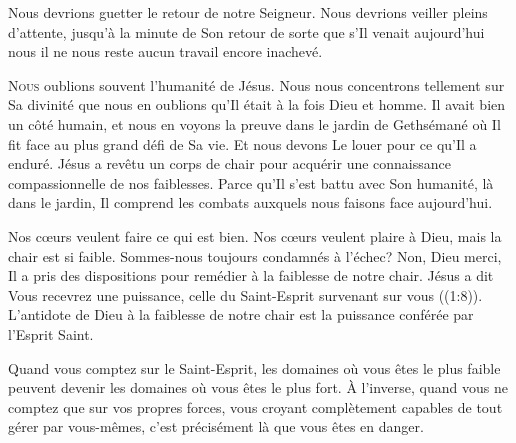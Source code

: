 
Nous devrions guetter le retour de notre Seigneur.
 Nous devrions veiller pleins d'attente, jusqu'à la minute de Son retour
 \ocadr de sorte que s'Il venait aujourd'hui
 nous il ne nous reste aucun travail encore inachevé.

\dvrule






\lettrine{N}{ous} oublions souvent l'humanité de Jésus.
 Nous nous concentrons tellement sur Sa divinité que nous en oublions
 qu'Il était à la fois Dieu et homme. Il avait bien un côté humain,
 et nous en voyons la preuve dans le jardin de Gethsémané
 \ocadr où Il fit face au plus grand défi de Sa vie.
 Et nous devons Le  louer pour ce qu'Il a enduré.
 Jésus a revêtu un corps de chair pour acquérir une connaissance
 compassionnelle de nos faiblesses. Parce qu'Il s'est battu avec Son humanité,
 là dans le jardin, Il comprend les combats auxquels nous faisons
 face aujourd'hui.

Nos c\oe{}urs veulent faire ce qui est bien.
 Nos c\oe{}urs veulent plaire à Dieu, mais la chair est si faible.
 Sommes-nous toujours condamnés à l'échec? Non, Dieu merci,
 Il a pris des dispositions pour remédier à la faiblesse de notre chair.
 Jésus a dit\frcolon{} 
 \Og Vous recevrez une puissance, celle du Saint-Esprit survenant sur vous \Fg{}
 ((1:8)).
 L'antidote de Dieu à la faiblesse de notre chair
 est la puissance conférée par l'Esprit Saint.


Quand vous comptez sur le Saint-Esprit, les domaines où vous êtes
 le plus faible peuvent devenir les domaines où vous êtes le plus fort.
 À l'inverse, quand vous ne comptez que sur vos propres forces,
 vous croyant complètement capables de tout gérer par vous-mêmes,
 c'est précisément là que vous êtes en danger.

